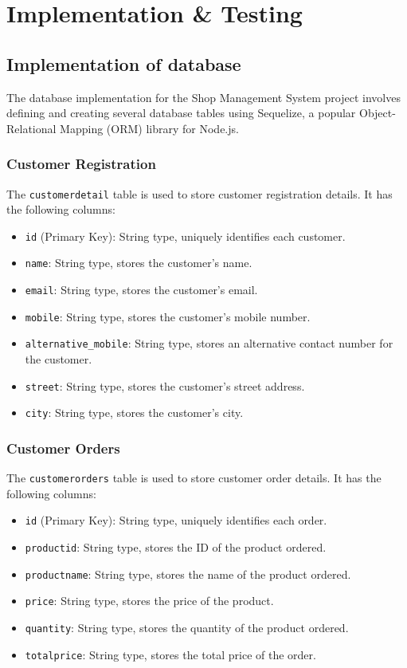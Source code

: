 \chapter{Implementation \& Testing}
\section{Implementation of database}
\vspace{0.2cm}


The database implementation for the Shop Management System project involves defining and creating several database tables using Sequelize, a popular Object-Relational Mapping (ORM) library for Node.js.

\subsection{Customer Registration}

The \texttt{customerdetail} table is used to store customer registration details. It has the following columns:

\begin{itemize}
    \item \texttt{id} (Primary Key): String type, uniquely identifies each customer.
    \item \texttt{name}: String type, stores the customer's name.
    \item \texttt{email}: String type, stores the customer's email.
    \item \texttt{mobile}: String type, stores the customer's mobile number.
    \item \texttt{alternative\_mobile}: String type, stores an alternative contact number for the customer.
    \item \texttt{street}: String type, stores the customer's street address.
    \item \texttt{city}: String type, stores the customer's city.
\end{itemize}

\subsection{Customer Orders}

The \texttt{customerorders} table is used to store customer order details. It has the following columns:

\begin{itemize}
    \item \texttt{id} (Primary Key): String type, uniquely identifies each order.
    \item \texttt{productid}: String type, stores the ID of the product ordered.
    \item \texttt{productname}: String type, stores the name of the product ordered.
    \item \texttt{price}: String type, stores the price of the product.
    \item \texttt{quantity}: String type, stores the quantity of the product ordered.
    \item \texttt{totalprice}: String type, stores the total price of the order.
\end{itemize}

